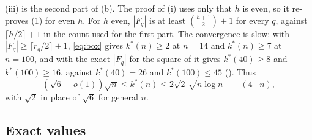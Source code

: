 (iii) is the second part of (b).
The proof of (i) uses only that $h$ is even, so it re-proves (1) for even $h$.
For $h$ even, $|F_q|$ is at least $\binom{h+1}2+1$ for every $q$, against $\lceil h/2\rceil+1$ in the count used for the first part.
The convergence is slow: with $|F_q|\ge\lceil r_q/2\rceil+1$, \eqref{eq:box} gives $k^*(n)\ge2$ at $n=14$ and $k^*(n)\ge7$ at $n=100$, and with the exact $|F_q|$ for the square of  it gives $k^*(40)\ge8$ and $k^*(100)\ge16$, against $k^*(40)=26$ and $k^*(100)\le45$ ().
Thus
\[
(\sqrt6-o(1))\sqrt n\le k^*(n)\le2\sqrt2\,\sqrt{n\log n}\qquad(4\mid n),
\]
with $\sqrt2$ in place of $\sqrt6$ for general $n$.

\subsection{Exact values}
\label{sec:kstar_exact}

